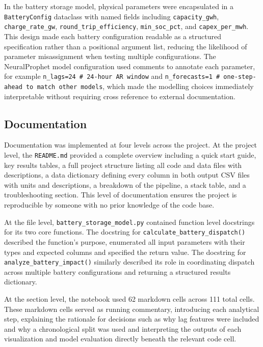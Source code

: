 \documentclass[conference]{IEEEtran}
\begin{document}
In the battery storage model, physical parameters were encapsulated in a \texttt{BatteryConfig} dataclass with named fields including \texttt{capacity\_gwh}, \texttt{charge\_rate\_gw}, \texttt{round\_trip\_efficiency}, \texttt{min\_soc\_pct}, and \texttt{capex\_per\_mwh}. This design made each battery configuration readable as a structured specification rather than a positional argument list, reducing the likelihood of parameter misassignment when testing multiple configurations. The NeuralProphet model configuration used comments to annotate each parameter, for example \texttt{n\_lags=24 \# 24-hour AR window} and \texttt{n\_forecasts=1 \# one-step-ahead to match other models}, which made the modelling choices immediately interpretable without requiring cross reference to external documentation.
 
\subsection{Documentation}
 
Documentation was implemented at four levels across the project. At the project level, the \texttt{README.md} provided a complete overview including a quick start guide, key results tables, a full project structure listing all code and data files with descriptions, a data dictionary defining every column in both output CSV files with units and descriptions, a breakdown of the pipeline, a stack table, and a troubleshooting section. This level of documentation ensures the project is reproducible by someone with no prior knowledge of the code base.
 
At the file level, \texttt{battery\_storage\_model.py} contained function level docstrings for its two core functions. The docstring for \texttt{calculate\_battery\_dispatch()} described the function's purpose, enumerated all input parameters with their types and expected columns and specified the return value. The docstring for \texttt{analyze\_battery\_impact()} similarly described its role in coordinating dispatch across multiple battery configurations and returning a structured results dictionary.
 
At the section level, the notebook used 62 markdown cells across 111 total cells. These markdown cells served as running commentary, introducing each analytical step, explaining the rationale for decisions such as why lag features were included and why a chronological split was used and interpreting the outputs of each visualization and model evaluation directly beneath the relevant code cell.
 
\end{document}
